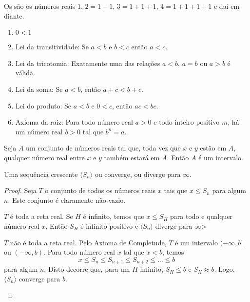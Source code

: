 \documentclass{svmono}
\begin{document}
\begin{defin}
Os  são os números reais $1$, $2 = 1+1$,
$3 = 1+1+1$, $4 = 1+1+1+1$ e daí em diante.
\end{defin}


\begin{enumerate}[A]
\item $0 < 1$
\item Lei da transitividade: Se $a < b$ e $b < c$ então $a < c$.
\item Lei da tricotomia: Exatamente uma das relações $a < b$, $a = b$ ou $a > b$ é válida.
\item Lei da soma: Se $a < b$, então $a + c < b + c$.
\item Lei do produto: Se $a < b$ e $0 < c$, então $ac < bc$.
\item Axioma da raiz: Para todo número real $a > 0$ e todo inteiro positivo
      $m$, há um número real $b > 0$ tal que $b^n = a$.
\end{enumerate}


Seja $A$ um conjunto de números reais tal que, toda vez que $x$ e $y$
estão em $A$, qualquer número real entre $x$ e $y$ também estará em $A$.
Então $A$ é um intervalo.

\begin{theor}
Uma sequência crescente $\langle S_n \rangle$ ou converge, ou diverge para
$\infty$.
\end{theor}

\begin{proof}
Seja $T$ o conjunto de todos os números reais $x$ tais que $x \le S_n$ para
algum $n$. Este conjunto é claramente não-vazio.

\begin{case}$T$ é toda a reta real. Se $H$ é infinito, temos que $x \le S_H$
para todo e qualquer número real $x$. Então $S_H$ é infinito positivo e
$\langle S_n \rangle$ diverge para $\infty$>
\end{case}

\begin{case}$T$ não é toda a reta real. Pelo Axioma de Completude,
$T$ é um intervalo $(-\infty,b]$ ou $(-\infty,b)$. Para todo número
real $x$ tal que $x < b$, temos
\[
	x \le S_n \le S_{n+1} \le S_{n+2} \le \ldots \le b
\]
para algum $n$. Disto decorre que, para um $H$ infinito, $S_H \le b$ e
$S_H \approx b$. Logo, $\langle S_n \rangle$ converge para $b$.
\end{case} \endproof%
\end{proof}
\end{document}
